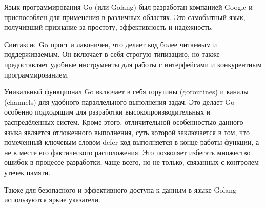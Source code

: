 Язык программирования Go (или Golang) был разработан компанией Google и приспособлен для применения в различных областях. Это самобытный язык, получивший признание за простоту, эффективность и надёжность\cite{BOOK_ABOUT_GO}.

Синтаксис Go прост и лаконичен, что делает код более читаемым и поддерживаемым. Он включает в себя строгую типизацию, но также предоставляет удобные инструменты для работы с интерфейсами и конкурентным программированием.

Уникальный функционал Go включает в себя горутины (goroutines) и каналы (channels) для удобного параллельного выполнения задач. Это делает Go особенно подходящим для разработки высокопроизводительных и распредёленных систем. Кроме этого, отличительной особенностью данного языка является отложенного выполнения, суть которой заключается в том, что помеченный ключевым словом defer код выполняется в конце работы функции, а не в месте его фактического расположения. Это позволяет избегать множество ошибок в процессе разработки, чаще всего, но не только, связанных с контролем утечек памяти.

Также для безопасного и эффективного доступа к данным в языке Golang используются яркие указатели.
